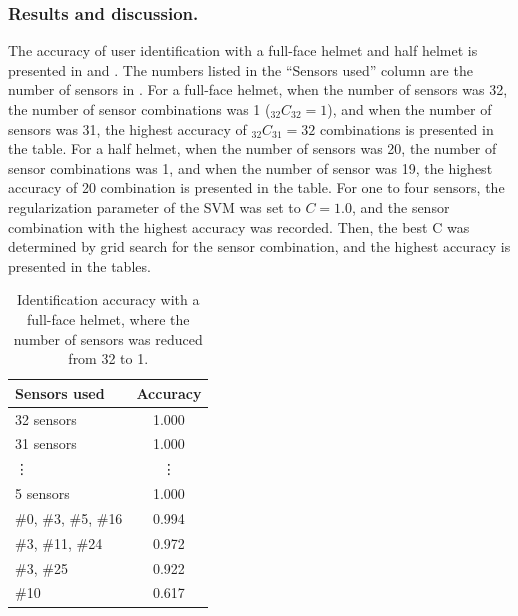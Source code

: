 \documentclass[english,preprint,JIP]{ipsj}
\begin{document}
\subsubsection{Results and discussion.}
The accuracy of user identification with a full-face helmet and half helmet is presented in  and . The numbers listed in the ``Sensors used'' column are the number of sensors in . For a full-face helmet, when the number of sensors was 32, the number of sensor combinations was 1 ($_{32}C_{32}=1$), and when the number of sensors was 31, the highest accuracy of $_{32}C_{31}=32$ combinations is presented in the table. For a half helmet, when the number of sensors was 20, the number of sensor combinations was 1, and when the number of sensor was 19, the highest accuracy of 20 combination is presented in the table. For one to four sensors, the regularization parameter of the SVM was set to $C=1.0$, and the sensor combination with the highest accuracy was recorded. Then, the best C was determined by grid search for the sensor combination, and the highest accuracy is presented in the tables.\par


\begin{table}[!t]
\centering
  \caption{Identification accuracy with a full-face helmet, where the number of sensors was reduced from 32 to 1.}
    \label{tab:full_num}
  \begin{tabular}{l|c} \hline\hline
    Sensors used & Accuracy \\ \hline
    32 sensors & 1.000 \\
    31 sensors & 1.000 \\
    \vdots & \vdots \\
    5 sensors & 1.000 \\
    $\#$0, $\#$3, $\#$5, $\#$16 & 0.994 \\
    $\#$3, $\#$11, $\#$24       & 0.972 \\
    $\#$3, $\#$25               & 0.922 \\
    $\#$10                      & 0.617 \\ \hline
  \end{tabular}
\end{table}
\end{document}
